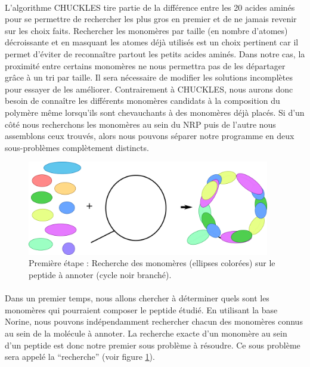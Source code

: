 \documentclass[12pt,french,twoside]{report}
\begin{document}
\paragraph{}L'algorithme CHUCKLES tire partie de la différence entre les 20 acides aminés pour se permettre de rechercher les plus gros en premier et de ne jamais revenir sur les choix faits.
Rechercher les monomères par taille (en nombre d'atomes) décroissante et en masquant les atomes déjà utilisés est un choix pertinent car il permet d'éviter de reconnaître partout les petits acides aminés.
Dans notre cas, la proximité entre certains monomères ne nous permettra pas de les départager grâce à un tri par taille.
Il sera nécessaire de modifier les solutions incomplètes pour essayer de les améliorer.
Contrairement à CHUCKLES, nous aurons donc besoin de connaître les différents monomères candidats à la composition du polymère même lorsqu'ils sont chevauchants à des monomères déjà placés.
Si d'un côté nous recherchons les monomères au sein du NRP puis de l'autre nous assemblons ceux trouvés, alors nous pouvons séparer notre programme en deux sous-problèmes complètement distincts.

\begin{figure}[!ht]
  \begin{center}
    \includegraphics[width=400px]{Figures/s2m/Intro/searching.png}
    \caption{\label{search_fig}Première étape : Recherche des monomères (ellipses colorées) sur le peptide à annoter (cycle noir branché).}
  \end{center}
\end{figure}

\paragraph{}Dans un premier temps, nous allons chercher à déterminer quels sont les monomères qui pourraient composer le peptide étudié.
En utilisant la base Norine, nous pouvons indépendamment rechercher chacun des monomères connus au sein de la molécule à annoter.
La recherche exacte d'un monomère au sein d'un peptide est donc notre premier sous problème à résoudre.
Ce sous problème sera appelé la ``recherche'' (voir figure \ref{search_fig}).
\end{document}
